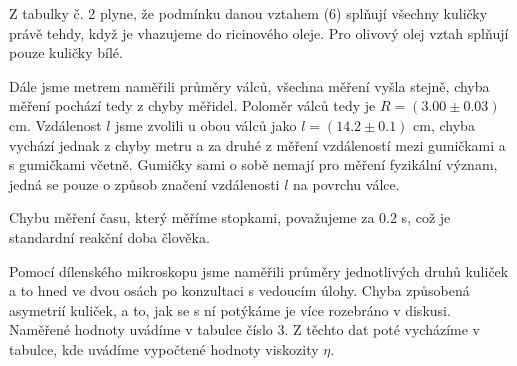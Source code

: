 \documentclass[a4paper]{article}
\begin{document}
\par Z tabulky č. 2 plyne, že podmínku danou vztahem (6) splňují všechny kuličky právě tehdy, když je vhazujeme do ricinového oleje. Pro olivový olej vztah splňují pouze kuličky bílé.
\par Dále jsme metrem naměřili průměry válců, všechna měření vyšla stejně, chyba měření pochází tedy z chyby měřidel. Poloměr válců tedy je $R = (3.00\pm0.03)$  $\mathrm{cm}$. Vzdálenost $l$ jsme zvolili u obou válců jako $l = (14.2\pm0.1)$  $\mathrm{cm}$, chyba vychází jednak z chyby metru a za druhé z měření vzdáleností mezi gumičkami a s gumičkami včetně. Gumičky sami o sobě nemají pro měření fyzikální význam, jedná se pouze o způsob značení vzdálenosti $l$ na povrchu válce.
\par Chybu měření času, který měříme stopkami, považujeme za 0.2 s, což je standardní reakční doba člověka.
\par Pomocí dílenského mikroskopu jsme naměřili průměry jednotlivých druhů kuliček a to hned ve dvou osách po konzultaci s vedoucím úlohy. Chyba způsobená asymetrií kuliček, a to, jak se s ní potýkáme je více rozebráno v diskusi. Naměřené hodnoty uvádíme v tabulce číslo 3. Z těchto dat poté vycházíme v tabulce, kde uvádíme vypočtené hodnoty viskozity $\eta$.
\newpage
\end{document}
